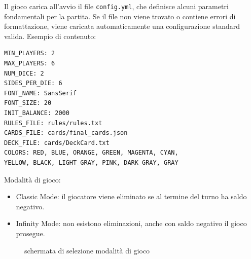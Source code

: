 Il gioco carica all’avvio il file \texttt{config.yml}, che definisce alcuni parametri fondamentali per la partita. Se il file non viene trovato o contiene errori di formattazione, viene caricata automaticamente una configurazione standard valida.\newline
Esempio di contenuto:\newline
\begin{verbatim}
MIN_PLAYERS: 2
MAX_PLAYERS: 6
NUM_DICE: 2
SIDES_PER_DIE: 6
FONT_NAME: SansSerif
FONT_SIZE: 20
INIT_BALANCE: 2000
RULES_FILE: rules/rules.txt
CARDS_FILE: cards/final_cards.json
DECK_FILE: cards/DeckCard.txt
COLORS: RED, BLUE, ORANGE, GREEN, MAGENTA, CYAN, 
YELLOW, BLACK, LIGHT_GRAY, PINK, DARK_GRAY, GRAY
\end{verbatim}
Modalità di gioco:\newline
\begin{itemize}
    \item Classic Mode: il giocatore viene eliminato se al termine del turno ha saldo negativo.
    \item Infinity Mode: non esistono eliminazioni, anche con saldo negativo il gioco prosegue.
\end{itemize}
\begin{figure}[H]
    \centering
    \caption{schermata di selezione modalità di gioco}
	\label{img:gamescreen}
\end{figure}
